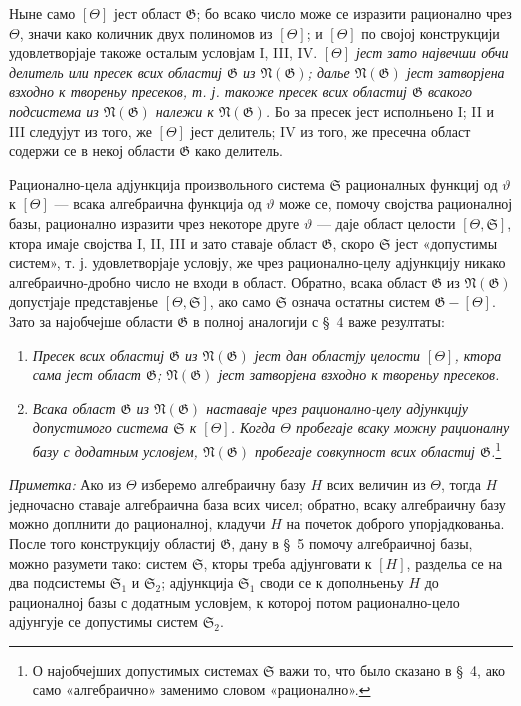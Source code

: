 ﻿\documentclass[11pt]{article}
\begin{document}
Ныне само $[\Theta]$ јест област $\mathfrak G$; бо всако число може се изразити
рационално чрез $\Theta$, значи како количник двух полиномов из $[\Theta]$; и
$[\Theta]$ по својој конструкцији удовлетворјаје такоже осталым условјам I, III,
IV. {\itshape $[\Theta]$ јест зато највечши обчи делитель или пресек всих
областиј $\mathfrak G$ из $\mathfrak N(\mathfrak G)$; далье
$\mathfrak N(\mathfrak G)$ јест затворјена взходно к твореньу пресеков, т. ј.
такоже пресек всих областиј $\mathfrak G$ всакого подсистема из
$\mathfrak N(\mathfrak G)$ належи к $\mathfrak N(\mathfrak G)$.} Бо за пресек
јест исполньено I; II и III следујут из того, же $[\Theta]$ јест делитель; IV из
того, же пресечна област содержи се в некој области $\mathfrak G$ како
делитель.

Рационално-цела адјункција произвольного система $\mathfrak S$ рационалных
функциј од $\vartheta$ к $[\Theta]$ --- всака алгебраична функција од
$\vartheta$ може се, помочу својства рационалној базы, рационално изразити чрез
некоторе друге $\vartheta$ --- даје област целости $[\Theta,\mathfrak S]$,
ктора имаје својства I, II, III и зато ставаје област $\mathfrak G$, скоро
$\mathfrak S$ јест «допустимы систем», т. ј. удовлетворјаје условју, же чрез
рационално-целу адјункцију никако алгебраично-дробно число не входи в област.
Обратно, всака област $\mathfrak G$ из $\mathfrak N(\mathfrak G)$ допустјаје
представјенье $[\Theta,\mathfrak S]$, ако само $\mathfrak S$ означа остатны
систем $\mathfrak G-[\Theta]$. Зато за најобчејше области $\mathfrak G$ в полној
аналогији с \S\ 4 важе резултаты:
\begin{enumerate}
\item[а)] {\itshape Пресек всих областиј $\mathfrak G$ из
$\mathfrak N(\mathfrak G)$ јест дан областју целости $[\Theta]$, ктора сама
јест област $\mathfrak G$; $\mathfrak N(\mathfrak G)$ јест затворјена взходно к
твореньу пресеков.}
\item[б)] {\itshape Всака област $\mathfrak G$ из $\mathfrak N(\mathfrak G)$
наставаје чрез рационално-целу адјункцију допустимого система $\mathfrak S$ к
$[\Theta]$. Когда $\Theta$ пробегаје всаку можну рационалну базу с додатным
условјем, $\mathfrak N(\mathfrak G)$ пробегаје совкупност всих областиј
$\mathfrak G$.}\footnote{О најобчејших допустимых системах $\mathfrak S$ важи
то, что было сказано в \S\ 4, ако само «алгебраично» заменимо словом
«рационално».}
\end{enumerate}

{\itshape Приметка:} Ако из $\Theta$ изберемо алгебраичну базу $H$ всих величин
из $\Theta$, тогда $H$ једночасно ставаје алгебраична база всих чисел; обратно,
всаку алгебраичну базу можно доплнити до рационалној, кладучи $H$ на почеток
доброго упорјадкованьа. После того конструкцију областиј $\mathfrak G$, дану в
\S\ 5 помочу алгебраичној базы, можно разумети тако: систем $\mathfrak S$, кторы
треба адјунговати к $[H]$, раздельа се на два подсистемы $\mathfrak S_1$ и
$\mathfrak S_2$; адјункција $\mathfrak S_1$ своди се к дополньеньу $H$ до
рационалној базы с додатным условјем, к которој потом рационално-цело
адјунгује се допустимы систем $\mathfrak S_2$.
\end{document}
